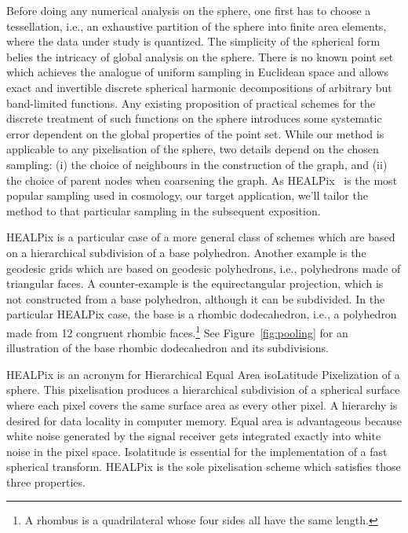 \documentclass[final,twocolumn,3p,times,authoryear]{elsarticle}
\newcommand{\figref}[1]{Figure~\ref{fig:#1}}
\newcommand{\1}{\b{1}}              %
\newcommand{\0}{\b{0}}              %
\begin{document}
Before doing any numerical analysis on the sphere, one first has to choose a tessellation, i.e., an exhaustive partition of the sphere into finite area elements, where the data under study is quantized.
The simplicity of the spherical form belies the intricacy of global analysis on the sphere.
There is no known point set which achieves the analogue of uniform sampling in Euclidean space and allows exact and invertible discrete spherical harmonic decompositions of arbitrary but band-limited functions.
Any existing proposition of practical schemes for the discrete treatment of such functions on the sphere introduces some systematic error dependent on the global properties of the point set.
While our method is applicable to any pixelisation of the sphere, two details depend on the chosen sampling: (i) the choice of neighbours in the construction of the graph, and (ii) the choice of parent nodes when coarsening the graph.
As HEALPix~\citep{gorski2005healpix} is the most popular sampling used in cosmology, our target application, we'll tailor the method to that particular sampling in the subsequent exposition.

HEALPix is a particular case of a more general class of schemes which are based on a hierarchical subdivision of a base polyhedron.
Another example is the geodesic grids which are based on geodesic polyhedrons, i.e., polyhedrons made of triangular faces. A counter-example is the equirectangular projection, which is not constructed from a base polyhedron, although it can be subdivided.
In the particular HEALPix case, the base is a rhombic dodecahedron, i.e., a polyhedron made from 12 congruent rhombic faces.\footnote{A rhombus is a quadrilateral whose four sides all have the same length.}
See \figref{pooling} for an illustration of the base rhombic dodecahedron and its subdivisions.

HEALPix is an acronym for Hierarchical Equal Area isoLatitude Pixelization of a sphere.
This pixelisation produces a hierarchical subdivision of a spherical surface where each pixel covers the same surface area as every other pixel.
A hierarchy is desired for data locality in computer memory.
Equal area is advantageous because white noise generated by the signal receiver gets integrated exactly into white noise in the pixel space.
Isolatitude is essential for the implementation of a fast spherical transform.
HEALPix is the sole pixelisation scheme which satisfies those three properties.
\end{document}
